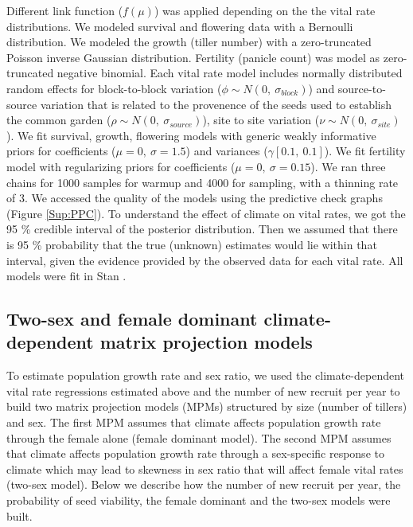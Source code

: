 \documentclass[12pt]{article}
\begin{document}
Different link function ($f(\mu)$) was applied depending on the the vital rate distributions. 
We modeled survival and flowering data with a Bernoulli distribution.
We modeled the growth (tiller number) with a zero-truncated Poisson inverse Gaussian distribution. 
Fertility (panicle count) was model as zero-truncated negative binomial. 
Each vital rate model includes normally distributed random effects for block-to-block variation ($\phi \sim N(0,\ \sigma_{block})$) and source-to-source variation that is related to the provenence of the seeds used to establish the common garden ($\rho \sim N(0,\ \sigma_{source})$), site to site variation ($\nu \sim N(0,\ \sigma_{site})$).
We fit survival, growth, flowering models with generic weakly informative priors for coefficients ($\mu = 0,\ \sigma = 1.5$) and variances ($\gamma [0.1,\ 0.1]$).
We fit fertility model with regularizing priors for coefficients ($\mu = 0,\ \sigma = 0.15$).
We ran three chains for 1000 samples for warmup and 4000 for sampling, with a thinning rate of 3.
We accessed the quality of the models using the predictive check graphs \citep{piironen2017comparison} (Figure \ref{Sup:PPC}).
To understand the effect of climate on vital rates, we got the 95 \% credible interval of the posterior distribution.  
Then we assumed that there is 95 \% probability that the true (unknown) estimates would lie within that interval, given the evidence provided by the observed data for each vital rate.
All models were fit in Stan \citep{rstan}. 

\subsection*{Two-sex and female dominant climate-dependent matrix projection models}
To estimate population growth rate and sex ratio, we used the climate-dependent vital rate regressions estimated above and the number of new recruit per year to build two matrix projection models (MPMs) structured by size (number of tillers) and sex.
The first MPM assumes that climate affects population growth rate through the female alone (female dominant model). 
The second MPM assumes that climate affects population growth rate through a sex-specific response to climate which may lead to skewness in sex ratio that will affect female vital rates (two-sex model). 
Below we describe how the number of new recruit per year, the probability of seed viability, the female dominant and the two-sex models were built.
\end{document}
